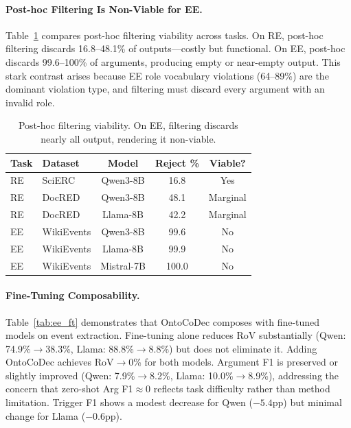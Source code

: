 \documentclass[11pt]{article}
\begin{document}
\paragraph{Post-hoc Filtering Is Non-Viable for EE.}
Table~\ref{tab:posthoc} compares post-hoc filtering viability across tasks.
On RE, post-hoc filtering discards 16.8--48.1\% of outputs---costly but functional.
On EE, post-hoc discards 99.6--100\% of arguments, producing empty or near-empty output.
This stark contrast arises because EE role vocabulary violations (64--89\%) are the dominant violation type, and filtering must discard every argument with an invalid role.

\begin{table}[t]
\centering
\small
\begin{tabular}{@{}llccc@{}}
\toprule
\textbf{Task} & \textbf{Dataset} & \textbf{Model} & \textbf{Reject \%} & \textbf{Viable?} \\
\midrule
RE & SciERC & Qwen3-8B & 16.8 & Yes \\
RE & DocRED & Qwen3-8B & 48.1 & Marginal \\
RE & DocRED & Llama-8B & 42.2 & Marginal \\
\midrule
EE & WikiEvents & Qwen3-8B & 99.6 & No \\
EE & WikiEvents & Llama-8B & 99.9 & No \\
EE & WikiEvents & Mistral-7B & 100.0 & No \\
\bottomrule
\end{tabular}
\caption{Post-hoc filtering viability. On EE, filtering discards nearly all output, rendering it non-viable.}
\label{tab:posthoc}
\end{table}

\paragraph{Fine-Tuning Composability.}
Table~\ref{tab:ee_ft} demonstrates that OntoCoDec composes with fine-tuned models on event extraction.
Fine-tuning alone reduces RoV substantially (Qwen: 74.9\%$\to$38.3\%, Llama: 88.8\%$\to$8.8\%) but does not eliminate it.
Adding OntoCoDec achieves RoV$\to$0\% for both models.
Argument F1 is preserved or slightly improved (Qwen: 7.9\%$\to$8.2\%, Llama: 10.0\%$\to$8.9\%), addressing the concern that zero-shot Arg F1$\approx$0 reflects task difficulty rather than method limitation.
Trigger F1 shows a modest decrease for Qwen ($-5.4$pp) but minimal change for Llama ($-0.6$pp).
\end{document}
